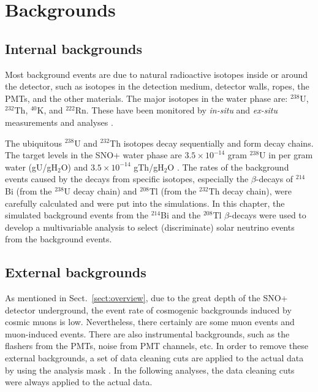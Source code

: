\section{Backgrounds}

\subsection{Internal backgrounds}

Most background events are due to natural radioactive isotopes inside or around the detector, such as isotopes in the detection medium, detector walls, ropes, the PMTs, and the other materials. The major isotopes in the water phase are: $^{238}$U, $^{232}$Th, $^{40}$K, and $^{222}$Rn. These have been monitored by \emph{in-situ} and \emph{ex-situ} measurements and analyses \cite{snop_jinst,waterunidoc}. 

The ubiquitous $^{238}$U and $^{232}$Th isotopes decay sequentially and form decay chains. 
The target levels in the SNO+ water phase are $3.5\times 10^{-14}$ gram $^{238}$U in per gram water (gU/gH$_2$O) and $3.5\times 10^{-14}$ gTh/gH$_2$O \cite{waterunidoc}. The rates of the background events caused by the decays from specific isotopes, especially the $\beta$-decays of $^{214}$Bi (from the $^{238}$U decay chain) and $^{208}$Tl (from the $^{232}$Th decay chain), were carefully calculated and were put into the simulations. In this chapter, the simulated background events from the $^{214}$Bi and the $^{208}$Tl $\beta$-decays were used to develop a multivariable analysis to select (discriminate) solar neutrino events from the background events.

\subsection{External backgrounds}

As mentioned in Sect.~\ref{sect:overview}, due to the great depth of the SNO+ detector underground, the event rate of cosmogenic backgrounds induced by cosmic muons is low. Nevertheless, there certainly are some muon events and muon-induced events. There are also instrumental backgrounds, such as the flashers from the PMTs, noise from PMT channels, etc. In order to remove these external backgrounds, a set of data cleaning cuts are applied to the actual data by using the analysis mask \cite{dataCleanDoc}. In the following analyses, the data cleaning cuts were always applied to the actual data.

